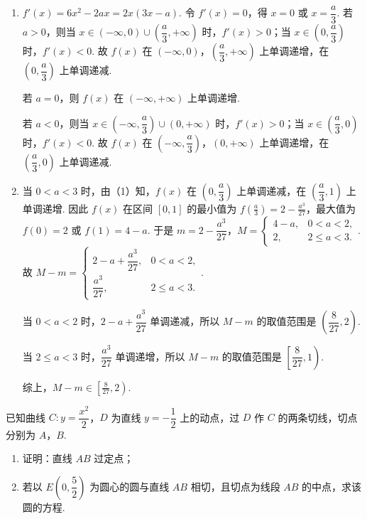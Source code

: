\begin{solution}
\begin{enumerate}
\item \(f'(x)=6x^2-2ax=2x(3x-a)\).
令 \(f'(x)=0\)，得 \(x=0\) 或 \(x=\dfrac a3\).
若 \(a>0\)，则当 \(x\in(-\infty,0)\cup\left(\dfrac a3,+\infty\right)\) 时，\(f'(x)>0\)；当 \(x\in\left(0,\dfrac a3\right)\) 时，\(f'(x)<0\).
故 \(f(x)\) 在 \((-\infty,0)\)，\(\left(\dfrac a3,+\infty\right)\) 上单调递增，在 \(\left(0,\dfrac a3\right)\) 上单调递减.

若 \(a=0\)，则 \(f(x)\) 在 \((-\infty,+\infty)\) 上单调递增.

若 \(a<0\)，则当 \(x\in\left(-\infty,\dfrac a3\right)\cup(0,+\infty)\) 时，\(f'(x)>0\)；当 \(x\in\left(\dfrac a3,0\right)\) 时，\(f'(x)<0\).
故 \(f(x)\) 在 \(\left(-\infty,\dfrac a3\right)\)，\((0,+\infty)\) 上单调递增，在 \(\left(\dfrac a3,0\right)\) 上单调递减.

\item 当 \(0<a<3\) 时，由（1）知，\(f(x)\) 在 \(\left(0,\dfrac a3\right)\) 上单调递减，在 \(\left(\dfrac a3,1\right)\) 上单调递增.
因此 \(f(x)\) 在区间 \([0,1]\) 的最小值为 \(f\!\left(\frac a3\right)=2-\frac{a^3}{27}\)，最大值为 \(f(0)=2\) 或 \(f(1)=4-a\).
于是 \(m=2-\dfrac{a^3}{27}\)，\(M=\begin{cases}
4-a, & 0<a<2,\\
2, & 2\le a<3.
\end{cases}\).
故 \(M-m=\begin{cases}
2-a+\dfrac{a^3}{27}, & 0<a<2,\\[6pt]
\dfrac{a^3}{27}, & 2\le a<3.
\end{cases}\).

当 \(0<a<2\) 时，\(2-a+\dfrac{a^3}{27}\) 单调递减，所以 \(M-m\) 的取值范围是 \(\left(\dfrac{8}{27},2\right)\).

当 \(2\le a<3\) 时，\(\dfrac{a^3}{27}\) 单调递增，所以 \(M-m\) 的取值范围是 \(\left[\dfrac{8}{27},1\right)\).

综上，\(M-m\in\left[\frac{8}{27},2\right)\).
\end{enumerate}
\end{solution}

\begin{problem}
已知曲线 \(C:y=\dfrac{x^2}{2}\)，\(D\) 为直线 \(y=-\dfrac12\) 上的动点，过 \(D\) 作 \(C\) 的两条切线，切点分别为 \(A\)，\(B\).

\begin{enumerate}
\item 证明：直线 \(AB\) 过定点；
\item 若以 \(E\left(0,\dfrac52\right)\) 为圆心的圆与直线 \(AB\) 相切，且切点为线段 \(AB\) 的中点，求该圆的方程.
\end{enumerate}
\end{problem}

